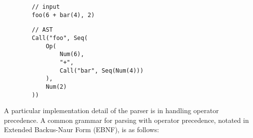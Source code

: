 \begin{tcolorbox}
    \begin{verbatim}
        // input
        foo(6 + bar(4), 2)
    \end{verbatim}
    \tcblower
    \begin{verbatim}
        // AST
        Call("foo", Seq(
            Op(
                Num(6),
                "+",
                Call("bar", Seq(Num(4)))
            ),
            Num(2)
        ))
    \end{verbatim}
\end{tcolorbox}




A particular implementation detail of the parser is in handling operator precedence. A common
grammar for parsing with operator precedence, notated in Extended Backus-Naur Form (EBNF), is as
follows:

